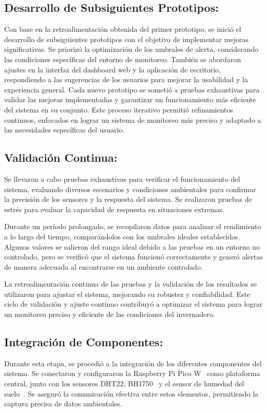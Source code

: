 \subsection{Desarrollo de Subsiguientes Prototipos:}
Con base en la retroalimentación obtenida del primer prototipo, se inició el desarrollo de subsiguientes prototipos con el objetivo de implementar mejoras significativas. Se priorizó la optimización de los umbrales de alerta, considerando las condiciones específicas del entorno de monitoreo. También se abordaron ajustes en la interfaz del dashboard web y la aplicación de escritorio, respondiendo a las sugerencias de los usuarios para mejorar la usabilidad y la experiencia general. Cada nuevo prototipo se sometió a pruebas exhaustivas para validar las mejoras implementadas y garantizar un funcionamiento más eficiente del sistema en su conjunto. Este proceso iterativo permitió refinamientos continuos, enfocados en lograr un sistema de monitoreo más preciso y adaptado a las necesidades específicas del usuario.

\subsection{Validación Continua:}
Se llevaron a cabo pruebas exhaustivas para verificar el funcionamiento del sistema, evaluando diversos escenarios y condiciones ambientales para confirmar la precisión de los sensores y la respuesta del sistema. Se realizaron pruebas de estrés para evaluar la capacidad de respuesta en situaciones extremas.

Durante un período prolongado, se recopilaron datos para analizar el rendimiento a lo largo del tiempo, comparándolos con los umbrales ideales establecidos. Algunos valores se salieron del rango ideal debido a las pruebas en un entorno no controlado, pero se verificó que el sistema funcionó correctamente y generó alertas de manera adecuada al encontrarse en un ambiente controlado.

La retroalimentación continua de las pruebas y la validación de los resultados se utilizaron para ajustar el sistema, mejorando su robustez y confiabilidad. Este ciclo de validación y ajuste continuo contribuyó a optimizar el sistema para lograr un monitoreo preciso y eficiente de las condiciones del invernadero.

\subsection{Integración de Componentes:}
Durante esta etapa, se procedió a la integración de los diferentes componentes del sistema. Se conectaron y configuraron la Raspberry Pi Pico W~\cite{misc:RPiPicoW} como plataforma central, junto con los sensores DHT22, BH1750~\cite{manual:BH1750} y el sensor de humedad del suelo~\cite{wiki:SensorHumedadSuelo}. Se aseguró la comunicación efectiva entre estos elementos, permitiendo la captura precisa de datos ambientales.

